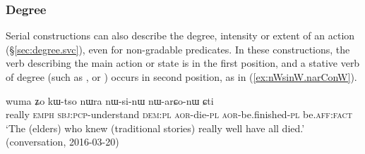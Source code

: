 \subsubsection{Degree} \label{sec:svc.degree}
Serial constructions can also describe the degree, intensity or extent of an action (§\ref{sec:degree.svc}), even for non-gradable predicates. In these constructions, the verb describing the main action or state is in the first position, and a stative verb of degree (such as ,  or ) occurs in second position, as in (\ref{ex:nWsinW.narConW}).

\begin{exe}
\ex \label{ex:nWsinW.narConW}
\gll   wuma ʑo kɯ-tso nɯra nɯ-si-nɯ nɯ-arɕo-nɯ ɕti \\
really \textsc{emph} \textsc{sbj}:\textsc{pcp}-understand \textsc{dem}:\textsc{pl} \textsc{aor}-die-\textsc{pl} \textsc{aor}-be.finished-\textsc{pl} be.\textsc{aff}:\textsc{fact} \\
\glt `The (elders) who knew (traditional stories) really well have all died.' (conversation, 2016-03-20)
\end{exe}


